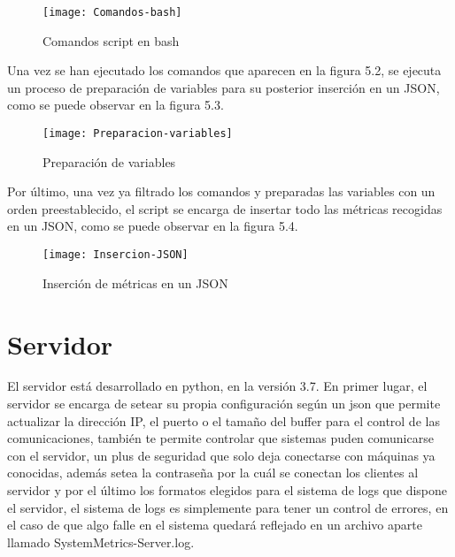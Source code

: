 \documentclass[ spanish, a4paper, 12pt, oneside]{report}
\begin{document}
\begin{figure}[!h]
   \centering
   \texttt{[image: Comandos-bash]}\\
      \caption{\label{fig: Comandos script en bash} Comandos script en bash}
\end{figure}

Una vez se han ejecutado los comandos que aparecen en la figura 5.2, se ejecuta un proceso de preparación de variables para su posterior inserción en un JSON, como se puede observar 
en la figura 5.3. \\

\begin{figure}[!h]
   \centering
   \texttt{[image: Preparacion-variables]}\\
      \caption{\label{fig: Preparación de variables} Preparación de variables}
\end{figure}

Por último, una vez ya filtrado los comandos y preparadas las variables con un orden preestablecido, el script se encarga de insertar todo las métricas recogidas en un JSON, como se 
puede observar en la figura 5.4. \\ 

\begin{figure}[!h]
   \centering
   \texttt{[image: Insercion-JSON]}\\
      \caption{\label{fig: Inserción de métricas en un JSON} Inserción de métricas en un JSON}
\end{figure}

\section{Servidor}

El servidor está desarrollado en python, en la versión 3.7. En primer lugar, el servidor se encarga de setear su propia configuración según un json 
que permite actualizar la dirección IP, el puerto o el tamaño del buffer para el control de las comunicaciones, también te permite controlar que sistemas puden 
comunicarse con el servidor, un plus de seguridad que solo deja conectarse con máquinas ya conocidas, además setea la contraseña por la cuál se conectan los clientes 
al servidor y por el último los formatos elegidos para el sistema de logs que dispone el servidor, el sistema de logs es simplemente para tener un control de errores, 
en el caso de que algo falle en el sistema quedará reflejado en un archivo aparte llamado SystemMetrics-Server.log.\\
\end{document}
